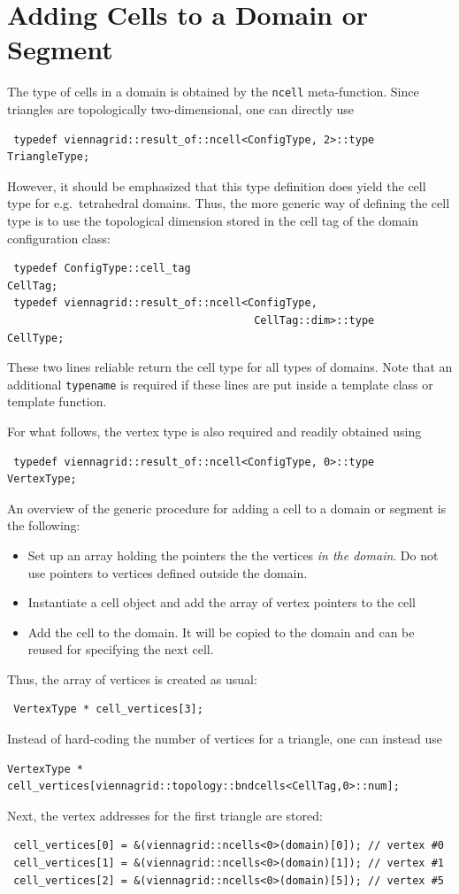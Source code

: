 \section{Adding Cells to a Domain or Segment}
The type of cells in a domain is obtained by the \lstinline|ncell| meta-function. Since triangles are topologically two-dimensional,
one can directly use
\begin{lstlisting}
 typedef viennagrid::result_of::ncell<ConfigType, 2>::type    TriangleType;
\end{lstlisting}
However, it should be emphasized that this type definition does yield the cell type for e.g.~tetrahedral domains.
Thus, the more generic way of defining the cell type is to use the topological dimension stored in the cell tag of the domain configuration class:
\begin{lstlisting}
 typedef ConfigType::cell_tag                                  CellTag;
 typedef viennagrid::result_of::ncell<ConfigType,
                                       CellTag::dim>::type     CellType;
\end{lstlisting}
These two lines reliable return the cell type for all types of domains. Note that an additional \lstinline|typename| is required if these lines are put inside a template class or template function.

For what follows, the vertex type is also required and readily obtained using
\begin{lstlisting}
 typedef viennagrid::result_of::ncell<ConfigType, 0>::type     VertexType;
\end{lstlisting}

An overview of the generic procedure for adding a cell to a domain or segment is the following:
  \begin{itemize}
   \item Set up an array holding the pointers the the vertices \emph{in the domain}. Do not use pointers to vertices defined outside the domain.
   \item Instantiate a cell object and add the array of vertex pointers to the cell
   \item Add the cell to the domain. It will be copied to the domain and can be reused for specifying the next cell.
  \end{itemize}
Thus, the array of vertices is created as usual:
\begin{lstlisting}
 VertexType * cell_vertices[3];
\end{lstlisting}
Instead of hard-coding the number of vertices for a triangle, one can instead use 
\begin{lstlisting}
VertexType * cell_vertices[viennagrid::topology::bndcells<CellTag,0>::num];
\end{lstlisting}
Next, the vertex addresses for the first triangle are stored:
\begin{lstlisting}
 cell_vertices[0] = &(viennagrid::ncells<0>(domain)[0]); // vertex #0
 cell_vertices[1] = &(viennagrid::ncells<0>(domain)[1]); // vertex #1
 cell_vertices[2] = &(viennagrid::ncells<0>(domain)[5]); // vertex #5
\end{lstlisting}

